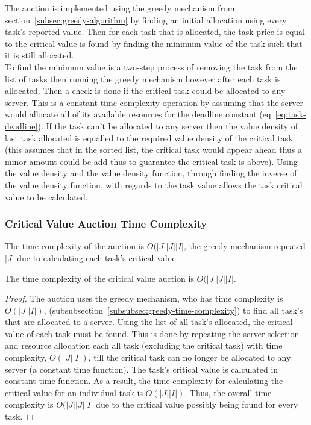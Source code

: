 The auction is implemented using the greedy mechanism from section~\ref{subsec:greedy-algorithm} by finding an initial
allocation using every task's reported value. Then for each task that is allocated, the task price is equal to the
critical value is found by finding the minimum value of the task such that it is still allocated. \\
To find the minimum value is a two-step process of removing the task from the list of tasks then running the greedy
mechanism however after each task is allocated. Then a check is done if the critical task could be allocated to any
server. This is a constant time complexity operation by assuming that the server would allocate all of its available
resources for the deadline constant (eq~\ref{eq:task-deadline}). If the task can't be allocated to any server then the
value density of last task allocated is equalled to the required value density of the critical task (this assumes that
in the sorted list, the critical task would appear ahead thus a minor amount could be add thus to guarantee the
critical task is above). Using the value density and the value density function, through finding the inverse of the
value density function, with regards to the task value allows the task critical value to be calculated.

\subsubsection{Critical Value Auction Time Complexity}
\label{subsubsec:critical-value-auction-time-complexity}
The time complexity of the auction is $O(\left|J\right| \left|J\right| \left|I\right|$, the greedy
mechanism repeated $\left|J\right|$ due to calculating each task's critical value.
\begin{theorem}
    The time complexity of the critical value auction is $O(\left|J\right| \left|J\right| \left|I\right|$.
\end{theorem}
\begin{proof}
    The auction uses the greedy mechanism, who has time complexity is $O(\left|J\right| \left|I\right|)$,
    (subsubsection~\ref{subsubsec:greedy-time-complexity}) to find all task's that are allocated to a server. Using the %
    list of all task's allocated, the critical value of each task must be found. This is done by repeating the
    server selection and resource allocation each all task (excluding the critical task) with time complexity,
    $O(\left|J\right| \left|I\right|)$, till the critical task can no longer be allocated to any server (a constant time function).
    The task's critical value is calculated in constant time function. As a result, the time complexity for
    calculating the critical value for an individual task is $O(\left|J\right| \left|I\right|)$. Thus, the overall time
    complexity is $O(\left|J\right| \left|J\right| \left|I\right|$ due to the critical value possibly being
    found for every task.
\end{proof}

